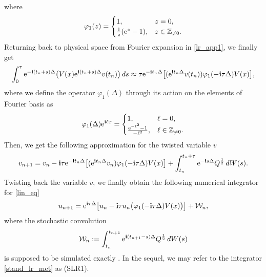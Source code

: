 \documentclass[a4paper]{amsart}
\begin{document}
where 
$$
\varphi_1(z)=\begin{cases}
    1, & z=0,\\
    \frac{1}{z}({\rm e}^{z}-1), & z\in\mathbb{Z}_{\ne 0}.
\end{cases}
$$
Returning back to physical space from Fourier expansion in \eqref{lr_app1}, we finally get
$$
\int_{0}^{\tau}{\rm e}^{-{\bf i}(t_n+s)\Delta}\big(V(x){\rm e}^{{\bf i}(t_n+s)\Delta}v(t_n)\big)\,ds\approx \tau {\rm e}^{-{\bf i}t_n\Delta }\big[({\rm e}^{{\bf i}t_n\Delta }v(t_n)) \varphi_1(-{\bf i}\tau \Delta)V(x)\big],
$$
where we define the operator $\varphi_1(\Delta)$ through its action on the elements of Fourier basis as
$$
\varphi_1(\Delta){\rm e}^{{\bf i}\ell x}=\begin{cases}
    1, & \ell=0,\\
    \frac{{\rm e}^{-\ell^2}-1}{-\ell^2}, &\ell\in\mathbb{Z}_{\ne 0}.
\end{cases}
$$
Then, we get the following approximation for the twisted variable $v$
$$
v_{n+1}=v_n-{\bf i}\tau {\rm e}^{-{\bf i}t_n\Delta }\big[({\rm e}^{{\bf i}t_n\Delta }v_n )\varphi_1(-{\bf i}\tau \Delta)V(x)\big]+\int_{t_n}^{t_n+\tau}{\rm e}^{-{\bf i}s \Delta}Q^{\frac{1}{2}}\,dW(s).
$$
Twisting back the variable $v$, we finally obtain the following numerical integrator for \eqref{lin_eq}
\begin{equation}
    \label{stand_lr_met}
u_{n+1}={\rm e}^{{\bf i}\tau\Delta}\big[u_n-{\bf i}\tau u_n \big(\varphi_1(-{\bf i}\tau \Delta)V(x)\big)\big]
+\mathcal{W}_n,
\end{equation}
where the stochastic convolution 
$$\mathcal{W}_n:=\int_{t_n}^{t_{n+1}}{\rm e}^{{\bf i}(t_{n+1}-s)\Delta} Q^{\frac{1}{2}}\,dW(s)
$$
is supposed to be simulated exactly \cite{lord}. In the sequel, we may refer to the integrator \eqref{stand_lr_met} as (SLR1).
\end{document}
